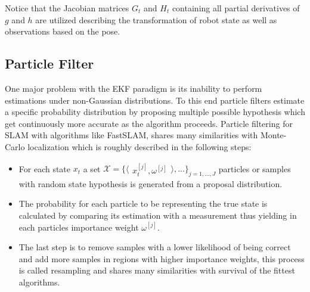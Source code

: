 Notice that the Jacobian matrices $G_{t}$ and $H_{t}$ containing all partial derivatives of $g$ and $h$ are utilized describing the transformation of robot state as well as observations based on the pose.




\subsection{Particle Filter}
One major problem with the EKF paradigm is its inability to perform estimations under non-Gaussian distributions. 
To this end particle filters estimate a specific probability distribution by proposing multiple possible hypothesis which get continuously more accurate as the algorithm proceeds. 
Particle filtering for SLAM with algorithms like FastSLAM, shares many similarities with Monte-Carlo localization which is roughly described in the following steps:
\begin{itemize}
	\item For each state $ x_{t} $ a set 
	$
	\mathcal{X} = 
	\{ 
	\langle
	\begin{matrix}
		 x_{t}^{[j]},  \omega^{[j]}
	\end{matrix}
	\rangle
	, ...
	\}
	_{j=1, ..., J}
	$
	particles or samples 
	with random state hypothesis is generated from a proposal distribution. 
	\item The probability for each particle to be representing the true state is calculated by comparing its estimation with a measurement thus yielding in each particles importance weight $ \omega^{[j]} $.
	\item The last step is to remove samples with a lower likelihood of being correct and add more samples in regions with higher importance weights, this process is called resampling and shares many similarities with survival of the fittest algorithms.
\end{itemize}

